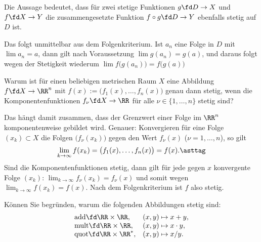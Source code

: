 \begin{antwort}
  Die Aussage bedeutet, dass für zwei stetige Funktionen 
  $g\fd D \to X$ und $f\fd X\to Y$ die zusammengesetzte Funktion 
  $f\circ g \fd D \to Y$ ebenfalls stetig auf $D$ ist. 

  Das folgt {\zB} unmittelbar aus dem Folgenkriterium. Ist $a_n$ eine 
  Folge in $D$ mit $\lim a_n=a$, dann gilt nach Voraussetzung 
  $\lim g(a_n)=g(a)$, und daraus folgt wegen der Stetigkeit wiederum 
  $\lim f\big(g(a_n)\big)=f\big(g(a)\big)$
  \AntEnd
\end{antwort}



\begin{frage}\label{09_komponenten}
  Warum ist für einen beliebigen metrischen Raum $X$ eine Abbildung 
  $f\fd X\to \RR^n$ 
  mit $f(x) := \big( f_1(x),\ldots, f_n(x) \big)$ 
  genau dann stetig, wenn die Komponentenfunktionen 
  $f_\nu \fd X \to \RR$ für alle $\nu \in \{1,\ldots, n \}$ 
  stetig sind?
\end{frage}

\begin{antwort}
  Das hängt damit zusammen, dass der Grenzwert einer 
  Folge im $\RR^n$ komponentenweise gebildet wird. Genauer: 
  Konvergieren für eine Folge $(x_k)\subset X$ 
  die Folgen $\big(f_\nu (x_k) \big)$ gegen den Wert $f_\nu (x)$ 
  ($\nu=1,\ldots,n$), so gilt 
  \begin{equation}
    \lim_{k\to\infty} f(x_k)= 
    \big( f_1(x), \ldots, f_n(x) \big) = f(x). 
    \asttag
  \end{equation}
  Sind die Komponentenfunktionen stetig, dann gilt 
  für jede gegen $x$ konvergente Folge $(x_k)$: 
  $\lim_{k\to\infty} f_\nu(x_k) = f_\nu(x)$ und somit wegen {\astref}  
  $\lim_{k\to\infty} f (x_k) = f (x)$.  
  Nach dem Folgenkriterium ist $f$ also stetig.
  \AntEnd
\end{antwort}

\begin{frage}\label{09_addstet}
  Können Sie begründen, warum die folgenden Abbildungen 
  stetig sind:
  \[
  \begin{array}{ll}
    \mathrm{add}\fd \RR\times \RR, & (x,y) \mapsto x+y,  \\
    \mathrm{mult}\fd \RR\times \RR, & (x,y) \mapsto x\cdot y, \\ 
    \mathrm{quot}\fd \RR\times \RR^*, &  (x,y) \mapsto x/y.
  \end{array}
  \]
\end{frage}

